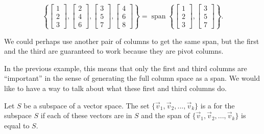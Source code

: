 \begin{exampleSol}
\begin{equation*}
\left\{
\begin{bmatrix}
1 \\
2 \\
3 
\end{bmatrix}
,
\begin{bmatrix}
2 \\
4 \\
6
\end{bmatrix}
,
\begin{bmatrix}
3 \\
5 \\
7
\end{bmatrix}
,
\begin{bmatrix}
4 \\
6 \\
8
\end{bmatrix}
\right\}
=
\operatorname{span}
\left\{
\begin{bmatrix}
1 \\
2 \\
3
\end{bmatrix}
,
\begin{bmatrix}
3 \\
5 \\
7
\end{bmatrix}
\right\} .
\end{equation*}
\end{exampleSol}
We could perhaps use another pair of columns to get the same span, but the
first and the third are guaranteed to work because they are pivot columns. 

In the previous example, this means that only the first and third columns are ``important'' in the sense of generating the full column space as a span. We would like to have a way to talk about what these first and third columns do.

\begin{definition}
Let $S$ be a subspace of a vector space. The set $\{\vec{v}_1, \vec{v}_2, ..., \vec{v}_k\}$ is a \emph{} for the subspace $S$ if each of these vectors are in $S$ and the span of $\{\vec{v}_1, \vec{v}_2, ..., \vec{v}_k\}$ is equal to $S$. 
\end{definition}

